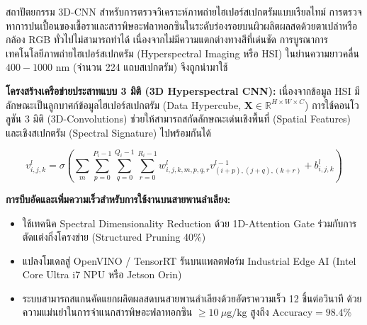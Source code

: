 \begin{aibox}{สถาปัตยกรรม 3D-CNN สำหรับการตรวจวิเคราะห์ภาพถ่ายไฮเปอร์สเปกตรัมแบบเรียลไทม์}
การตรวจหาการปนเปื้อนของเชื้อราและสารพิษอะฟลาทอกซินในระดับร่องรอยบนผิวผลิตผลสดด้วยตาเปล่าหรือกล้อง RGB ทั่วไปไม่สามารถทำได้ เนื่องจากไม่มีความแตกต่างทางสีที่เด่นชัด การบูรณาการเทคโนโลยีภาพถ่ายไฮเปอร์สเปกตรัม (Hyperspectral Imaging หรือ HSI) ในย่านความยาวคลื่น $400 - 1000 \text{ nm}$ (จำนวน 224 แถบสเปกตรัม) จึงถูกนำมาใช้

\textbf{โครงสร้างเครือข่ายประสาทแบบ 3 มิติ (3D Hyperspectral CNN):}
เนื่องจากข้อมูล HSI มีลักษณะเป็นลูกบาศก์ข้อมูลไฮเปอร์สเปกตรัม (Data Hypercube, $\mathbf{X} \in \mathbb{R}^{H \times W \times C}$) การใช้คอนโวลูชัน 3 มิติ (3D-Convolutions) ช่วยให้สามารถสกัดลักษณะเด่นเชิงพื้นที่ (Spatial Features) และเชิงสเปกตรัม (Spectral Signature) ไปพร้อมกันได้

\begin{equation}
    v_{i, j, k}^{l} = \sigma \left( \sum_{m} \sum_{p=0}^{P_i-1} \sum_{q=0}^{Q_i-1} \sum_{r=0}^{R_i-1} w_{i, j, k, m, p, q, r}^{l} v_{(i+p), (j+q), (k+r)}^{l-1} + b_{i, j, k}^{l} \right)
\end{equation}

\textbf{การบีบอัดและเพิ่มความเร็วสำหรับการใช้งานบนสายพานลำเลียง:}
\begin{itemize}
    \item ใช้เทคนิค Spectral Dimensionality Reduction ด้วย 1D-Attention Gate ร่วมกับการตัดแต่งกิ่งโครงข่าย (Structured Pruning 40\%)
    \item แปลงโมเดลสู่ OpenVINO / TensorRT รันบนแพลตฟอร์ม Industrial Edge AI (Intel Core Ultra i7 NPU หรือ Jetson Orin)
    \item ระบบสามารถสแกนคัดแยกผลิตผลสดบนสายพานลำเลียงด้วยอัตราความเร็ว 12 ชิ้นต่อวินาที ด้วยความแม่นยำในการจำแนกสารพิษอะฟลาทอกซิน $\ge 10 \ \mu\text{g/kg}$ สูงถึง $\text{Accuracy} = 98.4\%$
\end{itemize}
\end{aibox}

